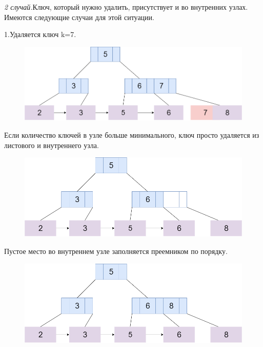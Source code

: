 \documentclass{article}
\begin{document}
   
   

   \textit{2 случай.}Ключ, который нужно удалить, присутствует и во внутренних узлах. Имеются следующие случаи для этой ситуации.
   
   1.Удаляется ключ k=7.
   \begin{figure}
   \includegraphics[scale=0.4]{dell11.png}

\caption{}
\end{figure}

   
   Если количество ключей в узле больше минимального, ключ просто удаляется из листового и внутреннего узла.
   \begin{figure}
   \includegraphics[scale=0.4]{dell22.png}

\caption{}
\end{figure}

   
Пустое место во внутреннем узле заполняется преемником по порядку.
\begin{figure}
\includegraphics[scale=0.4]{dell33.png}

\caption{}
\end{figure}
\end{document}
